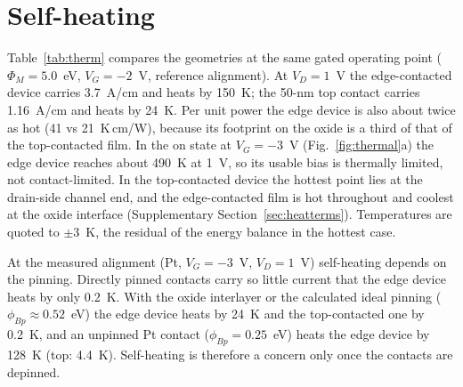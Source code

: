 \documentclass[11pt]{article}
\begin{document}
\section{Self-heating}
\label{sec:heat}
Table~\ref{tab:therm} compares the geometries at the same gated operating point ($\Phi_M=5.0$~eV, $V_G=-2$~V, reference alignment). At $V_D=1$~V the edge-contacted device carries 3.7~A/cm and heats by 150~K; the 50-nm top contact carries 1.16~A/cm and heats by 24~K. Per unit power the edge device is also about twice as hot (41 vs 21~K\,cm/W), because its footprint on the oxide is a third of that of the top-contacted film. In the on state at $V_G=-3$~V (Fig.~\ref{fig:thermal}a) the edge device reaches about 490~K at 1~V, so its usable bias is thermally limited, not contact-limited. In the top-contacted device the hottest point lies at the drain-side channel end, and the edge-contacted film is hot throughout and coolest at the oxide interface (Supplementary Section~\ref{sec:heatterms}). Temperatures are quoted to $\pm3$~K, the residual of the energy balance in the hottest case.

At the measured alignment (Pt, $V_G=-3$~V, $V_D=1$~V) self-heating depends on the pinning. Directly pinned contacts carry so little current that the edge device heats by only 0.2~K. With the oxide interlayer or the calculated ideal pinning ($\phi_{Bp}\approx0.52$~eV) the edge device heats by 24~K and the top-contacted one by 0.2~K, and an unpinned Pt contact ($\phi_{Bp}=0.25$~eV) heats the edge device by 128~K (top: 4.4~K). Self-heating is therefore a concern only once the contacts are depinned.
\end{document}
